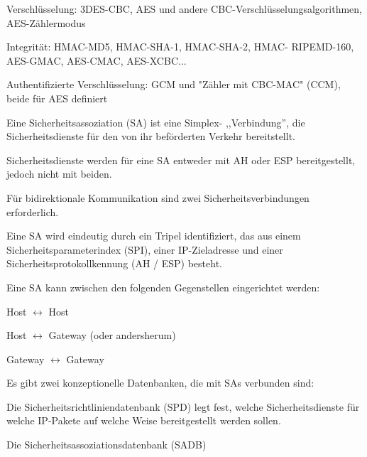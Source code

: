 \documentclass[a4paper]{article}
\begin{document}
\begin{multicols}{3}
\begin{itemize*}
\begin{itemize*}
                  \begin{itemize*}
                        \item Verschlüsselung: 3DES-CBC, AES und andere CBC-Verschlüsselungsalgorithmen, AES-Zählermodus
                        \item Integrität: HMAC-MD5, HMAC-SHA-1, HMAC-SHA-2, HMAC- RIPEMD-160, AES-GMAC, AES-CMAC, AES-XCBC...
                        \item Authentifizierte Verschlüsselung: GCM und "Zähler mit CBC-MAC" (CCM), beide für AES definiert
                  \end{itemize*}
            \end{itemize*}
            \item Eine Sicherheitsassoziation (SA) ist eine Simplex- ,,Verbindung'', die Sicherheitsdienste für den von ihr beförderten Verkehr bereitstellt.
            \begin{itemize*}
                  \item Sicherheitsdienste werden für eine SA entweder mit AH oder ESP bereitgestellt, jedoch nicht mit beiden.
                  \item Für bidirektionale Kommunikation sind zwei Sicherheitsverbindungen erforderlich.
                  \item Eine SA wird eindeutig durch ein Tripel identifiziert, das aus einem Sicherheitsparameterindex (SPI), einer IP-Zieladresse und einer Sicherheitsprotokollkennung (AH / ESP) besteht.
                  \item Eine SA kann zwischen den folgenden Gegenstellen eingerichtet werden:
                  \begin{itemize*}
                        \item Host $\leftrightarrow$ Host
                        \item Host $\leftrightarrow$ Gateway (oder andersherum)
                        \item Gateway $\leftrightarrow$ Gateway
                  \end{itemize*}
                  \item Es gibt zwei konzeptionelle Datenbanken, die mit SAs verbunden sind:
                  \begin{itemize*}
                        \item Die Sicherheitsrichtliniendatenbank (SPD) legt fest, welche Sicherheitsdienste für welche IP-Pakete auf welche Weise bereitgestellt werden sollen.
                        \item Die Sicherheitsassoziationsdatenbank (SADB)

\end{itemize*}
\end{itemize*}
\end{itemize*}
\end{multicols}
\end{document}
